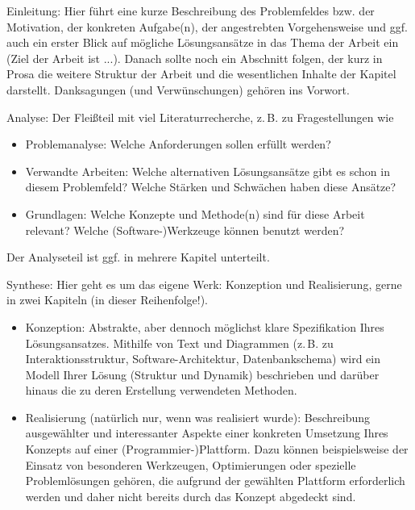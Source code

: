 \documentclass[11pt]{scrartcl}
\newcommand{\qto}[1]{\glqq #1\grqq}				%
\newcommand{\zB}{\mbox{z.\,B.}\xspace}
\newcommand{\ggf}{ggf.\xspace}
\newcommand{\bzw}{bzw.\xspace}
\begin{document}
\begin{gliederung}
	\item Einleitung: Hier führt eine kurze Beschreibung des Problemfeldes \bzw der Motivation, der konkreten Aufgabe(n), der angestrebten Vorgehensweise und \ggf auch ein erster Blick auf mögliche Lösungsansätze in das Thema der Arbeit ein (\qto{Ziel der Arbeit ist ...}). Danach sollte noch ein Abschnitt folgen, der kurz in Prosa die weitere Struktur der Arbeit und die wesentlichen Inhalte der Kapitel darstellt. Danksagungen (und Verwünschungen) gehören ins Vorwort.
	
	\item Analyse: Der \qto{Fleißteil} mit viel Literaturrecherche, \zB zu Fragestellungen wie
	\begin{itemize}
		\item Problemanalyse: Welche Anforderungen sollen erfüllt werden?
		\item Verwandte Arbeiten: Welche alternativen Lösungsansätze gibt es schon in diesem Problemfeld? Welche Stärken und Schwächen haben diese Ansätze?
		\item Grundlagen: Welche Konzepte und Methode(n) sind für diese Arbeit relevant? Welche (Software-)Werkzeuge können benutzt werden?
	\end{itemize}
	Der Analyseteil ist \ggf in mehrere Kapitel unterteilt.

	\item Synthese: Hier geht es um das eigene \qto{Werk}: Konzeption und Realisierung, gerne in zwei Kapiteln (in dieser Reihenfolge!).
	\begin{itemize}
		\item Konzeption: Abstrakte, aber dennoch möglichst klare Spezifikation Ihres Lösungsansatzes. Mithilfe von Text und Diagrammen (\zB zu Interaktionsstruktur, Software-Architektur, Datenbankschema) wird ein Modell Ihrer Lösung (Struktur und Dynamik) beschrieben und darüber hinaus die zu deren Erstellung verwendeten Methoden.
		\item Realisierung (natürlich nur, wenn was realisiert wurde): Beschreibung ausgewählter und interessanter Aspekte einer konkreten Umsetzung Ihres Konzepts auf einer (Programmier-)Plattform. Dazu können beispielsweise der Einsatz von besonderen Werkzeugen, Optimierungen oder spezielle Problemlösungen gehören, die aufgrund der gewählten Plattform erforderlich werden und daher nicht bereits durch das Konzept abgedeckt sind. 

	\end{itemize}
		

\end{gliederung}
\end{document}
